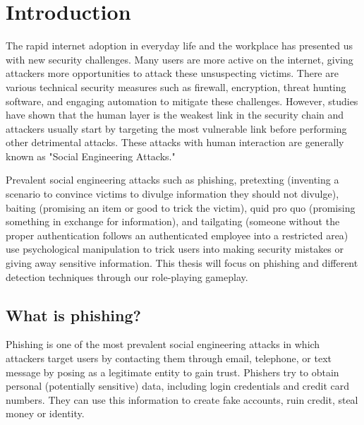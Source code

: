 

\pagestyle{plain} %
\setcounter{page}{1}


\chapter{Introduction}
The rapid internet adoption in everyday life and the workplace has presented us with new security challenges. Many users are more active on the internet, giving attackers more opportunities to attack these unsuspecting victims. There are various technical security measures such as firewall, encryption, threat hunting software, and engaging automation to mitigate these challenges. However, studies have shown that the human layer is the weakest link in the security chain \cite{jampen} and attackers usually start by targeting the most vulnerable link before performing other detrimental attacks. These attacks with human interaction are generally known as "Social Engineering Attacks."

Prevalent social engineering attacks such as phishing, pretexting (inventing a scenario to convince victims to divulge information they should not divulge), baiting (promising an item or good to trick the victim), quid pro quo (promising something in exchange for information), and tailgating (someone without the proper authentication follows an authenticated employee into a restricted area) use psychological manipulation to trick users into making security mistakes or giving away sensitive information. This thesis will focus on phishing and different detection techniques through our role-playing gameplay.
\section{What is phishing?}

Phishing is one of the most prevalent social engineering attacks in which attackers target users by contacting them through email, telephone, or text message by posing as a legitimate entity \cite{phishing, apwg} to gain trust. Phishers try to obtain personal (potentially sensitive) data, including login credentials and credit card numbers. They can use this information to create fake accounts, ruin credit, steal money or identity.

